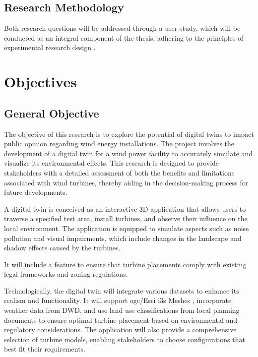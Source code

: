 \documentclass[11pt, titlepage, a4paper]{scrartcl}
\begin{document}
\begin{linenumbers}
\subsection{Research Methodology}

Both research questions will be addressed through a user study, which will be conducted as an integral component of the thesis, adhering to the principles of experimental research design \cite{lazarResearchMethodsHuman2017}.

\section{Objectives}
\subsection{General Objective}
The objective of this research is to explore the potential of digital twins to impact public opinion regarding wind energy installations. The project involves the development of a digital twin for a wind power facility to accurately simulate and visualize its environmental effects. This research is designed to provide stakeholders with a detailed assessment of both the benefits and limitations associated with wind turbines, thereby aiding in the decision-making process for future developments.

A digital twin is conceived as an interactive 3D application that allows users to traverse a specified test area, install turbines, and observe their influence on the local environment. The application is equipped to simulate aspects such as noise pollution and visual impairments, which include changes in the landscape and shadow effects caused by the turbines.

It will include a feature to ensure that turbine placements comply with existing legal frameworks and zoning regulations.

Technologically, the digital twin will integrate various datasets to enhance its realism and functionality. It will support \gls{ogc}/Esri \gls{i3s} Meshes \cite{esriincI3sspec}, incorporate weather data from DWD, and use land use classifications from local planning documents %
to ensure optimal turbine placement based on environmental and regulatory considerations. The application will also provide a comprehensive selection of turbine models, enabling stakeholders to choose configurations that best fit their requirements.


\end{linenumbers}
\end{document}
